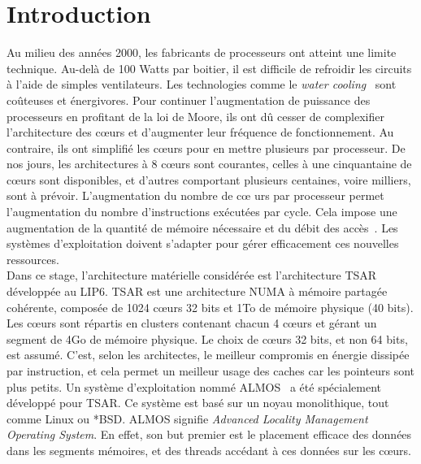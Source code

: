 \chapter{Introduction}

  Au milieu des années 2000, les fabricants de processeurs ont atteint une
  limite technique.  Au-delà de 100 Watts par boitier, il est difficile de
  refroidir les circuits à l'aide de simples ventilateurs. Les technologies
  comme le \textit{water cooling}~\citep{googleXXXXdatacenters} sont coûteuses
  et énergivores.  Pour continuer l'augmentation de puissance des processeurs en
  profitant de la loi de Moore, ils ont dû cesser de complexifier l'architecture
  des c\oe urs et d'augmenter leur fréquence de fonctionnement. Au contraire,
  ils ont simplifié les c\oe urs pour en mettre plusieurs par processeur.  De
  nos jours, les architectures à 8 c\oe urs sont courantes, celles à une
  cinquantaine de c\oe urs sont disponibles, et d'autres comportant plusieurs
  centaines, voire milliers, sont à prévoir.  L'augmentation du nombre de c\oe
  urs par processeur permet l'augmentation du nombre d'instructions exécutées
  par cycle.  Cela impose une augmentation de la quantité de mémoire nécessaire
  et du débit des accès~\citep{hp2012z820, puget2013z9pe}. Les systèmes
  d'exploitation doivent s'adapter pour gérer efficacement ces nouvelles
  ressources.\\

  Dans ce stage, l'architecture matérielle considérée est l'architecture
  TSAR~\citep{greiner2009tsar}
  développée au LIP6. TSAR est une architecture NUMA à mémoire partagée cohérente, composée de 1024 c\oe urs 32 bits et
  1To de mémoire physique (40 bits).  Les c\oe urs sont répartis en clusters
  contenant chacun 4 c\oe urs et gérant un segment de 4Go de mémoire
  physique. Le choix de c\oe urs 32 bits, et non 64 bits, est assumé. C'est,
  selon les architectes, le meilleur compromis en énergie dissipée par
  instruction, et cela permet un meilleur usage des caches car les pointeurs
  sont plus petits.  Un système d'exploitation nommé
  ALMOS~\citep{almaless2011almos} a été spécialement développé pour TSAR. Ce
  système est basé sur un noyau monolithique, tout comme Linux ou
  *BSD. ALMOS signifie
  \textit{Advanced Locality Management Operating System}. En effet, son but
  premier est le placement efficace des données dans les segments mémoires, et
  des threads accédant à ces données sur les c\oe urs.\\

